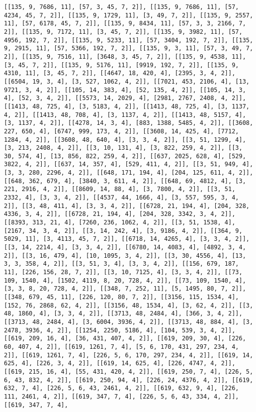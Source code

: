 \documentclass[12pt,fleqn]{article}\usepackage{../../common}
\begin{document}
\begin{verbatim}
[[135, 9, 7686, 11], [57, 3, 45, 7, 2]], [[135, 9, 7686, 11], [57, 4234, 45, 7, 2]], [[135, 9, 1729, 11], [3, 49, 7, 2]], [[135, 9, 2557, 11], [57, 6178, 45, 7, 2]], [[135, 9, 8434, 11], [57, 3, 3, 2166, 7, 2]], [[135, 9, 7172, 11], [3, 45, 7, 2]], [[135, 9, 3982, 11], [57, 4956, 192, 7, 2]], [[135, 9, 5233, 11], [57, 3404, 192, 7, 2]], [[135, 9, 2915, 11], [57, 5366, 192, 7, 2]], [[135, 9, 3, 11], [57, 3, 49, 7, 2]], [[135, 9, 7516, 11], [3648, 3, 45, 7, 2]], [[135, 9, 4538, 11], [3, 45, 7, 2]], [[135, 9, 5176, 11], [9919, 192, 7, 2]], [[135, 9, 4310, 11], [3, 45, 7, 2]], [[4647, 18, 420, 4], [2395, 3, 4, 2]], [[6504, 19, 3, 4], [3, 527, 1062, 4, 2]], [[7021, 453, 2106, 4], [13, 9721, 3, 4, 2]], [[105, 14, 383, 4], [52, 135, 4, 2]], [[105, 14, 3, 4], [52, 3, 4, 2]], [[5573, 14, 2029, 4], [2981, 2767, 2408, 4, 2]], [[1413, 48, 725, 4], [3, 5183, 4, 2]], [[1413, 48, 725, 4], [3, 1137, 4, 2]], [[1413, 48, 708, 4], [3, 1137, 4, 2]], [[1413, 48, 5157, 4], [3, 1137, 4, 2]], [[4278, 14, 3, 4], [883, 1388, 5485, 4, 2]], [[3608, 227, 650, 4], [6747, 999, 173, 4, 2]], [[3608, 14, 425, 4], [7712, 1284, 4, 2]], [[3608, 48, 640, 4], [3, 3, 4, 2]], [[3, 51, 1299, 4], [3, 213, 2408, 4, 2]], [[3, 10, 131, 4], [3, 822, 259, 4, 2]], [[3, 30, 574, 4], [13, 856, 822, 259, 4, 2]], [[637, 2025, 628, 4], [529, 3822, 4, 2]], [[637, 14, 357, 4], [529, 411, 4, 2]], [[3, 51, 949, 4], [3, 3, 280, 2296, 4, 2]], [[648, 171, 194, 4], [204, 125, 611, 4, 2]], [[648, 362, 679, 4], [3840, 3, 611, 4, 2]], [[648, 69, 4812, 4], [3, 221, 2916, 4, 2]], [[8609, 14, 88, 4], [3, 7800, 4, 2]], [[3, 51, 2332, 4], [3, 3, 4, 2]], [[4537, 44, 1666, 4], [3, 557, 595, 3, 4, 2]], [[3, 48, 411, 4], [3, 3, 4, 2]], [[6728, 21, 194, 4], [204, 328, 4336, 3, 4, 2]], [[6728, 21, 194, 4], [204, 328, 3342, 3, 4, 2]], [[8393, 313, 21, 4], [7260, 236, 1062, 4, 2]], [[3, 51, 1538, 4], [2167, 34, 3, 4, 2]], [[3, 14, 242, 4], [3, 9186, 4, 2]], [[364, 9, 5029, 11], [3, 4113, 45, 7, 2]], [[6718, 14, 4265, 4], [3, 3, 4, 2]], [[3, 14, 2214, 4], [3, 3, 4, 2]], [[6780, 14, 4083, 4], [4892, 3, 4, 2]], [[3, 16, 479, 4], [10, 1095, 3, 4, 2]], [[3, 30, 4556, 4], [13, 3, 3, 358, 4, 2]], [[3, 51, 3, 4], [3, 3, 4, 2]], [[156, 679, 187, 11], [226, 156, 28, 7, 2]], [[3, 10, 7125, 4], [3, 3, 4, 2]], [[73, 109, 1540, 4], [1502, 4119, 8, 20, 728, 4, 2]], [[73, 109, 1540, 4], [3, 3, 8, 20, 728, 4, 2]], [[348, 7, 252, 11], [5, 1495, 80, 7, 2]], [[348, 679, 45, 11], [226, 120, 80, 7, 2]], [[3156, 115, 1534, 4], [152, 76, 2868, 62, 4, 2]], [[3156, 48, 1534, 4], [3, 62, 4, 2]], [[3, 48, 1860, 4], [3, 3, 4, 2]], [[3713, 48, 2484, 4], [366, 3, 4, 2]], [[3713, 48, 2484, 4], [3, 6004, 3936, 4, 2]], [[3713, 48, 884, 4], [3, 2478, 3936, 4, 2]], [[1254, 2250, 5186, 4], [104, 539, 3, 4, 2]], [[619, 209, 16, 4], [36, 431, 407, 4, 2]], [[619, 209, 30, 4], [226, 60, 407, 4, 2]], [[619, 1261, 7, 4], [5, 6, 170, 431, 297, 234, 4, 2]], [[619, 1261, 7, 4], [226, 5, 6, 170, 297, 234, 4, 2]], [[619, 14, 625, 4], [226, 3, 4, 2]], [[619, 14, 625, 4], [226, 4747, 4, 2]], [[619, 215, 16, 4], [55, 431, 420, 4, 2]], [[619, 250, 7, 4], [226, 5, 6, 43, 832, 4, 2]], [[619, 250, 94, 4], [226, 24, 4376, 4, 2]], [[619, 632, 7, 4], [226, 5, 6, 43, 2461, 4, 2]], [[619, 632, 9, 4], [226, 111, 2461, 4, 2]], [[619, 347, 7, 4], [226, 5, 6, 43, 334, 4, 2]], [[619, 347, 7, 4], 
\end{verbatim}
\end{document}
